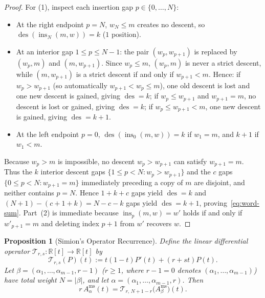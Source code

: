 \documentclass[11pt]{article}
\newtheorem{proposition}[theorem]{Proposition}
\theoremstyle{definition}
\newcommand{\RR}{\mathbb{R}}
\newcommand{\des}{\operatorname{des}}
\begin{document}
\begin{proof}
For (1), inspect each insertion gap $p \in \{0,\dots,N\}$:
\begin{itemize}
  \item At the right endpoint $p = N$, $w_N \le m$ creates no descent, so
  $\des(\operatorname{ins}_N(m,w)) = k$ ($1$ position).
  \item At an interior gap $1 \le p \le N-1$: the pair $(w_p, w_{p+1})$ is replaced by
  $(w_p, m)$ and $(m, w_{p+1})$. Since $w_p \le m$, $(w_p, m)$ is never a strict descent,
  while $(m, w_{p+1})$ is a strict descent if and only if $w_{p+1} < m$. Hence:
  if $w_p > w_{p+1}$ (so automatically $w_{p+1} < w_p \le m$), one old descent is lost and
  one new descent is gained, giving $\des = k$; if $w_p \le w_{p+1}$ and $w_{p+1} = m$, no
  descent is lost or gained, giving $\des = k$; if $w_p \le w_{p+1} < m$, one new descent is
  gained, giving $\des = k+1$.
  \item At the left endpoint $p = 0$, $\des(\operatorname{ins}_0(m,w)) = k$ if $w_1 = m$,
  and $k+1$ if $w_1 < m$.
\end{itemize}
Because $w_p > m$ is impossible, no descent $w_p > w_{p+1}$ can satisfy $w_{p+1} = m$. Thus
the $k$ interior descent gaps $\{1 \le p < N : w_p > w_{p+1}\}$ and the $c$ gaps
$\{0 \le p < N : w_{p+1} = m\}$ immediately preceding a copy of $m$ are disjoint, and
neither contains $p=N$. Hence $1 + k + c$ gaps yield $\des = k$ and $(N+1) - (c+1+k) =
N - c - k$ gaps yield $\des = k+1$, proving~\eqref{eq:word-sum}. Part~(2) is immediate
because $\operatorname{ins}_p(m,w) = w'$ holds if and only if $w'_{p+1} = m$ and deleting
index $p+1$ from $w'$ recovers $w$.
\end{proof}

\begin{proposition}[Simion's Operator Recurrence]\label{prop:simion-recurrence}
Define the linear differential operator $\mathcal{T}_{r,s} : \RR[t] \to \RR[t]$ by
\begin{equation}\label{eq:interlace-op}
  \mathcal{T}_{r,s}(P)(t) := t(1-t)P'(t) + (r + st)P(t).
\end{equation}
Let $\beta = (\alpha_1,\dots,\alpha_{m-1}, r-1)$ ($r \ge 1$, where $r-1=0$ denotes
$(\alpha_1,\dots,\alpha_{m-1})$) have total weight $N = |\beta|$, and let
$\alpha = (\alpha_1,\dots,\alpha_{m-1}, r)$. Then
\begin{equation}\label{eq:simion-rec}
  r\,A_\alpha^{\mathrm{ms}}(t) = \mathcal{T}_{r,\,N+1-r}\!\bigl(A_\beta^{\mathrm{ms}}\bigr)(t).
\end{equation}
\end{proposition}
\end{document}
